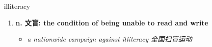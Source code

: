
\begin{frame}
{\huge illiteracy}
\begin{center}
\begin{enumerate}\Large
  \item \textbf{n. 文盲: the condition of being unable to read and write}
  \begin{itemize}
    \item \em{\Large{a nationwide campaign against illiteracy 全国扫盲运动}}
  \end{itemize}
\end{enumerate}
\end{center}
\end{frame}
